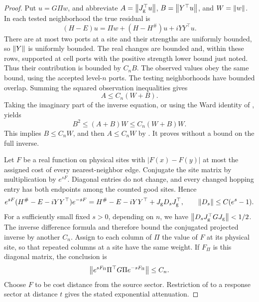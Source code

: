 \begin{proof}
Put $u=G\Pi w$, and abbreviate
$A=\left\lVert J_{\mathrm g}^\top u\right\rVert$,
$B=\left\lVert Y^\top u\right\rVert$, and $W=\left\lVert w\right\rVert$.
In each tested neighborhood the true residual is
\[
 (H-E)u=\Pi w+(H-H^\#)u+iYY^\top u.
\]
There are at most two ports at a site and their strengths are uniformly
bounded, so $\left\lVert Y\right\rVert$ is uniformly bounded. The real changes are
bounded and, within these rows, supported at cell ports with the
positive strength lower bound just noted. Thus their contribution is
bounded by $C_nB$. The observed values obey the same bound, using the
accepted level-$n$ ports. The testing neighborhoods have bounded
overlap. Summing the squared observation inequalities gives
\begin{equation}
 A\leq C_n(W+B).
 \label{screen:residual-observation}
\end{equation}
Taking the imaginary part of the inverse equation, or using the Ward
identity of , yields
\[
 B^2\leq (A+B)W\leq C_n(W+B)W.
\]
This implies $B\leq C_nW$, and then $A\leq C_nW$ by
. It proves
 without a bound on the full inverse.

Let $F$ be a real function on physical sites with
$|F(x)-F(y)|$ at most the assigned cost of every nearest-neighbor
edge. Conjugate the site matrix by multiplication by $e^{sF}$.
Diagonal entries do not change, and every changed hopping entry has
both endpoints among the counted good sites. Hence
\[
 e^{sF}(H^\#-E-iYY^\top)e^{-sF}
 =H^\#-E-iYY^\top+J_{\mathrm g}D_sJ_{\mathrm g}^\top,
 \qquad \left\lVert D_s\right\rVert\leq C(e^s-1).
\]
For a sufficiently small fixed $s>0$, depending on $n$, we have
$\left\lVert D_sJ_{\mathrm g}^\top GJ_{\mathrm g}\right\rVert<1/2$.
The inverse difference formula and
 therefore bound the conjugated projected
inverse by another $C_n$. Assign to each column of $\Pi$ the value of
$F$ at its physical site, so that repeated columns at a site have the
same weight. If $F_\Pi$ is this diagonal matrix, the conclusion is
\begin{equation}
 \left\lVert e^{sF_\Pi}\Pi^\top G\Pi e^{-sF_\Pi}\right\rVert\leq C_n.
 \label{screen:weighted-bound}
\end{equation}
Choose $F$ to be cost distance from the source sector. Restriction of
 to a response sector at distance $t$
gives the stated exponential attenuation.


\end{proof}

